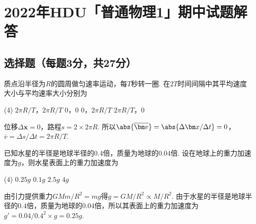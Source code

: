 \chapter{2022年\textsf{HDU}「普通物理1」期中试题解答}



\section{选择题（每题3分，共27分）}

\begin{problem} %
质点沿半径为$R$的圆周做匀速率运动，每$T$秒转一圈. 在$2T$时间间隔中其平均速度大小与平均速率大小分别为
\begin{tasks}(4)
    \task $2\pi R/T$，$2\pi R/T$
    \task $0$，$0$
    \task[\true] $0$，$2\pi R/T$
    \task $2\pi R/T$，$0$
\end{tasks}
\end{problem}
\begin{solution}
    位移$\Delta \bm x=0$，路程$s=2\times 2\pi R$. 所以$\abs{\overline{\bm v}}=\abs{\Delta\bm x/\Delta t}=0$，$\overline{v}=\Delta s/\Delta t=2\pi R/T$.
\end{solution}

\begin{problem}
    已知水星的半径是地球半径的$0.4$倍，质量为地球的$0.04$倍. 设在地球上的重力加速度为$g$，则水星表面上的重力加速度为
\begin{tasks}(4)
\task[\true] $0.25g$
\task $0.1g$
\task $2.5g$
\task $4g$
\end{tasks}
\end{problem}
\begin{solution}
    由引力提供重力$GMm/R^2=mg$得$g=GM/R^2\propto M/R^2$. 由于水星的半径是地球半径的$0.4$倍，质量为地球的$0.04$倍，所以其表面上的重力加速度为$g'=0.04/0.4^2\times g=0.25g$.
\end{solution}

